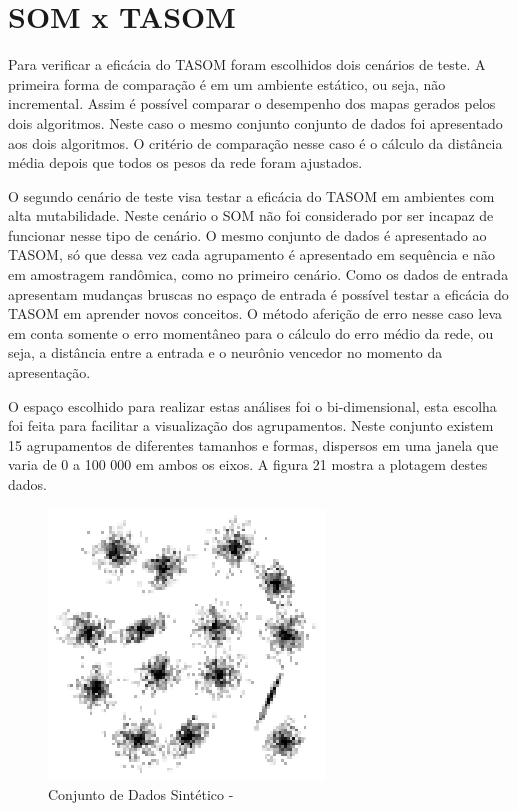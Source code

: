\chapter{SOM x TASOM}
Para verificar a eficácia do TASOM foram escolhidos dois cenários de teste. A primeira forma de comparação é em um ambiente estático, ou seja, não incremental. Assim é possível comparar o desempenho dos mapas gerados pelos dois algoritmos. Neste caso o mesmo conjunto conjunto de dados foi apresentado aos dois algoritmos. O critério de comparação nesse caso é o cálculo da distância média depois que todos os pesos da rede foram ajustados.

O segundo cenário de teste visa testar a eficácia do TASOM em ambientes com alta mutabilidade. Neste cenário o SOM não foi considerado por ser incapaz de funcionar nesse tipo de cenário. O mesmo conjunto de dados é apresentado ao TASOM, só que dessa vez cada agrupamento é apresentado em sequência e não em amostragem randômica, como no primeiro cenário. Como os dados de entrada apresentam mudanças bruscas no espaço de entrada é possível testar a eficácia do TASOM em aprender novos conceitos. O método aferição de erro nesse caso leva em conta somente o erro momentâneo para o cálculo do erro médio da rede, ou seja, a distância entre a entrada e o neurônio vencedor no momento da apresentação.

O espaço escolhido para realizar estas análises foi o bi-dimensional, esta escolha foi feita  para facilitar a visualização dos agrupamentos. Neste conjunto existem 15 agrupamentos de diferentes tamanhos e formas, dispersos em uma janela que varia de 0 a 100 000 em ambos os eixos. A figura 21 mostra a plotagem destes dados.

\begin{figure}[!h]
\centering
\includegraphics[keepaspectratio=true,scale=1]
{figuras/birch.eps}
\caption{Conjunto de Dados Sintético - }
\label{data_titatic}
\end{figure}

